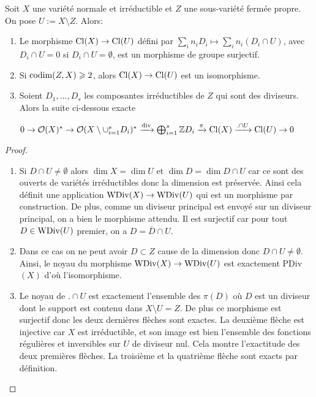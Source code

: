 \begin{thm}\label{divexactseq}
Soit $X$ une variété normale et irréductible et $Z$ une sous-variété fermée propre. On pose $U:=X\setminus Z$. Alors:
\begin{enumerate}
\item Le morphisme $\operatorname{Cl}(X)\rightarrow\operatorname{Cl}(U)$ défini par $\sum_i n_iD_i\mapsto \sum_i n_i(D_i\cap U)$, avec $D_i\cap U = 0$ si $D_i\cap U=\emptyset $, est un morphisme de groupe surjectif.
\item Si $\operatorname{codim}(Z,X)\geqslant 2$, alors $\operatorname{Cl}(X)\rightarrow \operatorname{Cl}(U)$ est un isomorphisme.
\item Soient $D_1,..., D_s$ les composantes irréductibles de $Z$ qui sont des diviseurs. Alors la suite ci-dessous exacte
\begin{center}
 $0\rightarrow\mathcal{O}(X)^*\rightarrow \mathcal{O}(X\setminus \cup_{i=1}^s D_i)^*\xrightarrow{\operatorname{div}} \bigoplus_{i=1}^s \mathbb{Z} D_i \xrightarrow{\pi} \operatorname{Cl}(X) \xrightarrow{.\cap U} \operatorname{Cl}(U) \rightarrow 0 $
\end{center}

\end{enumerate}
\end{thm}
\begin{proof}
\begin{enumerate}
\item Si $D\cap U\neq \emptyset$ alors $\dim X=\dim U$ et $\dim D=\dim D\cap U$ car ce sont des ouverts de variétés irréductibles donc la dimension est préservée. Ainsi cela définit une application $\operatorname{WDiv}(X)\rightarrow \operatorname{WDiv}(U)$ qui est un morphisme par construction. De plus, comme un diviseur principal est envoyé sur un diviseur principal, on a bien le morphisme attendu. Il est surjectif car pour tout $D\in\operatorname{WDiv}(U)$ premier, on a $D=\overline{D}\cap U$.
\item Dans ce cas on ne peut avoir $D\subset Z$ cause de la dimension donc $D\cap U\neq \emptyset$. Ainsi, le noyau du morphisme $\operatorname{WDiv}(X)\rightarrow \operatorname{WDiv}(U)$ est exactement PDiv$(X)$ d'où l'isomorphisme.
\item Le noyau de $.\cap U$ est exactement l'ensemble des $\pi(D)$ où $D$ est un diviseur dont le support est contenu dans $X\setminus U=Z$. De plus ce morphisme est surjectif donc les deux dernières flèches sont exactes. La deuxième flèche est injective car $X$ est irréductible, et son image est bien l'ensemble des fonctions régulières et inversibles sur $U$ de diviseur nul. Cela montre l'exactitude des deux premières flèches. La troisième et la quatrième flèche sont exacts par définition.
\end{enumerate}
\end{proof}

